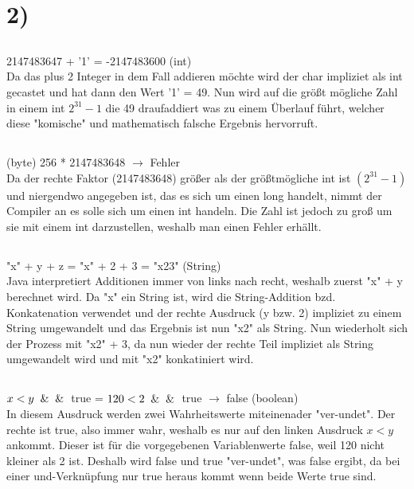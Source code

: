 \documentclass[12pt]{article}
\date{}
\begin{document}
\section{2)}
\subsection{}
\begin{center}
    2147483647 + '1' = -2147483600 (int)\\
    Da das plus 2 Integer in dem Fall addieren möchte wird der char impliziet als int gecastet und hat dann den Wert '1' = 49.
    Nun wird auf die größt mögliche Zahl in einem int $2^{31}-1$ die 49 draufaddiert was zu einem Überlauf führt, welcher diese "komische" und mathematisch falsche Ergebnis hervorruft.
\end{center}

\subsection{}
\begin{center}
    (byte) 256 * 2147483648 $\rightarrow$ Fehler\\
    Da der rechte Faktor (2147483648) größer als der größtmögliche int ist $(2^{31}-1)$ und niergendwo angegeben ist, das es sich um einen long handelt, nimmt der Compiler an es solle sich um einen int handeln. Die Zahl ist jedoch zu groß um sie mit einem int darzustellen, weshalb man einen Fehler erhällt.
\end{center}
    
\subsection{}
\begin{center}
    "x" + y + z = "x" + 2 + 3 = "x23" (String)\\
    Java interpretiert Additionen immer von links nach recht, weshalb zuerst "x" + y berechnet wird. Da "x" ein String ist, wird die String-Addition bzd. Konkatenation verwendet und der rechte Ausdruck (y bzw. 2) impliziet zu einem String umgewandelt und das Ergebnis ist nun "x2" als String. Nun wiederholt sich der Prozess mit "x2" + 3, da nun wieder der rechte Teil impliziet als String umgewandelt wird und mit "x2" konkatiniert wird.
\end{center}

\subsection{}
\begin{center}
    $x < y \And\And$  true = $120 < 2 \And\And$ true $\rightarrow$ false (boolean)\\
    In diesem Ausdruck werden zwei Wahrheitswerte miteinenader "ver-undet".
    Der rechte ist true, also immer wahr, weshalb es nur auf den linken Ausdruck $x < y$ ankommt. Dieser ist für die vorgegebenen Variablenwerte false, weil 120 nicht kleiner als 2 ist. Deshalb wird false und true "ver-undet", was false ergibt, da bei einer und-Verknüpfung nur true heraus kommt wenn beide Werte true sind.
\end{center}
\end{document}
